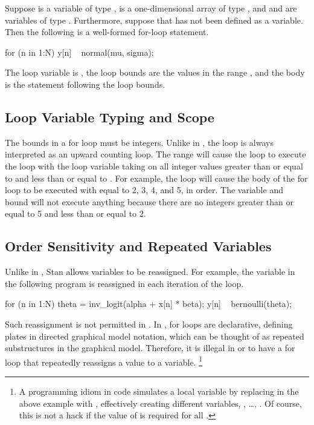Suppose
 is a variable of type ,  is a
one-dimensional array of type , and  and
 are variables of type .  Furthermore, suppose
that  has not been defined as a variable. Then the following
is a well-formed for-loop statement.
%
\begin{stancode}
for (n in 1:N) {
  y[n] ~ normal(mu, sigma);
}
\end{stancode}
%
The loop variable is , the loop bounds are the values in the
range , and the body is the statement following the
loop bounds.

\subsection{Loop Variable Typing and Scope}

The bounds in a for loop must be integers.  Unlike in \R, the loop is
always interpreted as an upward counting loop.  The range 
will cause the loop to execute the loop with the loop variable taking
on all integer values greater than or equal to  and less than
or equal to .  For example, the loop 
will cause the body of the for loop to be executed with  equal
to 2, 3, 4, and 5, in order.  The variable and bound  will not execute anything because there are no integers
greater than or equal to 5 and less than or equal to 2.

\subsection{Order Sensitivity and Repeated Variables}

Unlike in \BUGS, Stan allows variables to be reassigned.  For
example, the variable  in the following program is
reassigned in each iteration of the loop.
%
\begin{stancode}
for (n in 1:N) {
  theta = inv_logit(alpha + x[n] * beta);
  y[n] ~ bernoulli(theta);
}
\end{stancode}
%
Such reassignment is not permitted in \BUGS.  In \BUGS, for loops are
declarative, defining plates in directed graphical model notation,
which can be thought of as repeated substructures in the graphical
model.  Therefore, it is illegal in \BUGS or \JAGS to have a for loop
that repeatedly reassigns a value to a variable.%
%
\footnote{A programming idiom in \BUGS code simulates
a local variable by replacing  in the above example with
, effectively creating  different variables,
, \ldots, .  Of course, this is not a
hack if the value of  is required for all .}

